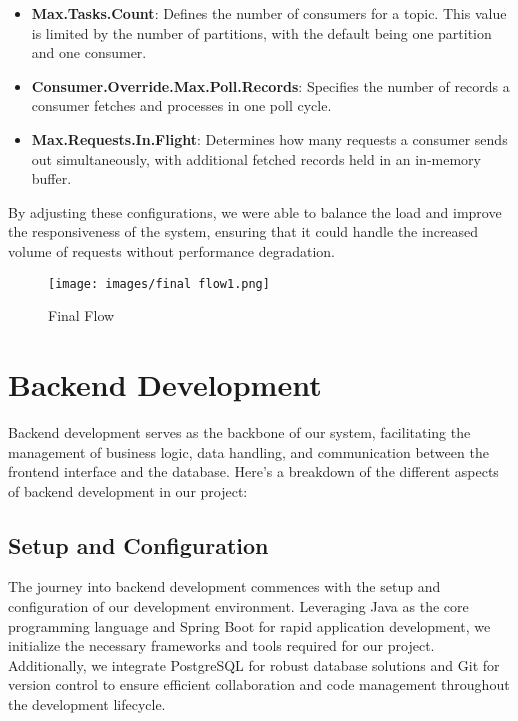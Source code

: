 \documentclass[12pt,a4paper]{report}
\begin{document}
\begin{itemize}
    \item \textbf{Max.Tasks.Count}: Defines the number of consumers for a topic. This value is limited by the number of partitions, with the default being one partition and one consumer.
    \item \textbf{Consumer.Override.Max.Poll.Records}: Specifies the number of records a consumer fetches and processes in one poll cycle.
    \item \textbf{Max.Requests.In.Flight}: Determines how many requests a consumer sends out simultaneously, with additional fetched records held in an in-memory buffer.
\end{itemize}

By adjusting these configurations, we were able to balance the load and improve the responsiveness of the system, ensuring that it could handle the increased volume of requests without performance degradation.

\begin{figure}[h]
  \centering
  \texttt{[image: images/final flow1.png]}\\[1.5cm]
  \caption{Final Flow}
  \label{fig:example}
\end{figure}


\section{Backend Development}

Backend development serves as the backbone of our system, facilitating the management of business logic, data handling, and communication between the frontend interface and the database. Here's a breakdown of the different aspects of backend development in our project:

\subsection{Setup and Configuration}

The journey into backend development commences with the setup and configuration of our development environment. Leveraging Java as the core programming language and Spring Boot for rapid application development, we initialize the necessary frameworks and tools required for our project. Additionally, we integrate PostgreSQL for robust database solutions and Git for version control to ensure efficient collaboration and code management throughout the development lifecycle.
\end{document}
